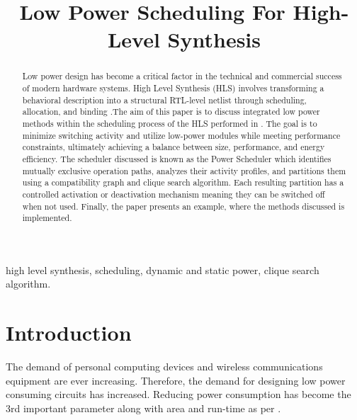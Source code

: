 \documentclass[conference]{IEEEtran}
\begin{document}
\title{Low Power Scheduling For High-Level Synthesis\\
}

\author{
}

\maketitle

\begin{abstract}
Low power design has become a critical factor in the technical and commercial success of modern hardware systems. High Level Synthesis (HLS) involves transforming a behavioral description into a structural RTL-level netlist through scheduling, allocation, and binding \cite{Ret} \cite{DDG92}.The aim of this paper is to discuss integrated low power methods within the scheduling process of the HLS performed in \cite{Ret}. The goal is to minimize switching activity and utilize low-power modules while meeting performance constraints, ultimately achieving a balance between size, performance, and energy efficiency. The scheduler discussed is known as the Power Scheduler \cite{Ret} which identifies mutually exclusive operation paths, analyzes their activity profiles, and partitions them using a compatibility graph and clique search algorithm. Each resulting partition has a controlled activation or deactivation mechanism meaning they can be switched off when not used. Finally, the paper presents an example, where the methods discussed is implemented.
\end{abstract}
\begin{IEEEkeywords}
high level synthesis, scheduling, dynamic and static power, clique search algorithm.
\end{IEEEkeywords}

\section{Introduction}
\label{sec: introduction}
The demand of personal computing devices and wireless communications equipment are ever increasing. Therefore, the demand for designing low power consuming circuits has increased. Reducing power consumption has become the 3rd important parameter along with area and run-time as per \cite{Saraju01}. 
\end{document}
